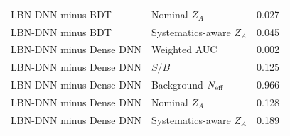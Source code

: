 \begin{table}[tb]
\begin{tabular}{llr}
    LBN-DNN minus BDT & Nominal $Z_A$ & 0.027 \\
    LBN-DNN minus BDT & Systematics-aware $Z_A$ & 0.045 \\
    LBN-DNN minus Dense DNN & Weighted AUC & 0.002 \\
    LBN-DNN minus Dense DNN & $S/B$ & 0.125 \\
    LBN-DNN minus Dense DNN & Background $N_{\rm eff}$ & 0.966 \\
    LBN-DNN minus Dense DNN & Nominal $Z_A$ & 0.128 \\
    LBN-DNN minus Dense DNN & Systematics-aware $Z_A$ & 0.189 \\
    \bottomrule
  \end{tabular}
\end{table}
